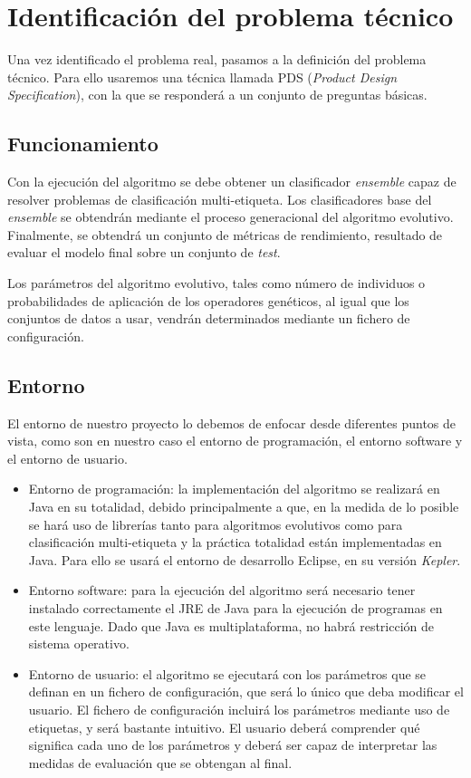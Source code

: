 \section{Identificación del problema técnico}
\label{sec:ProblemaTecnico}


Una vez identificado el problema real, pasamos a la definición del problema técnico. Para ello usaremos una técnica llamada PDS (\textit{Product Design Specification}), con la que se responderá a un conjunto de preguntas básicas.

\subsection{Funcionamiento}
Con la ejecución del algoritmo se debe obtener un clasificador \textit{ensemble} capaz de resolver problemas de clasificación multi-etiqueta. Los clasificadores base del  \textit{ensemble} se obtendrán mediante el proceso generacional del algoritmo evolutivo. Finalmente, se obtendrá un conjunto de métricas de rendimiento, resultado de evaluar el modelo final sobre un conjunto de \textit{test}.

Los parámetros del algoritmo evolutivo, tales como número de individuos o probabilidades de aplicación de los operadores genéticos, al igual que los conjuntos de datos a usar, vendrán determinados mediante un fichero de configuración.

\subsection{Entorno}
El entorno de nuestro proyecto lo debemos de enfocar desde diferentes puntos de vista, como son en nuestro caso el entorno de programación, el entorno software y el entorno de usuario.

\begin{itemize}
	\item Entorno de programación: la implementación del algoritmo se realizará en Java en su totalidad, debido principalmente a que, en la medida de lo posible se hará uso de librerías tanto para algoritmos evolutivos como para clasificación multi-etiqueta y la práctica totalidad están implementadas en Java. Para ello se usará el entorno de desarrollo Eclipse, en su versión \textit{Kepler}.
	\item Entorno software: para la ejecución del algoritmo será necesario tener instalado correctamente el JRE de Java para la ejecución de programas en este lenguaje. Dado que Java es multiplataforma, no habrá restricción de sistema operativo.
	\item Entorno de usuario: el algoritmo se ejecutará con los parámetros que se definan en un fichero de configuración, que será lo único que deba modificar el usuario. El fichero de configuración incluirá los parámetros mediante uso de etiquetas, y será bastante intuitivo. El usuario deberá comprender qué significa cada uno de los parámetros y deberá ser capaz de interpretar las medidas de evaluación que se obtengan al final.
\end{itemize}

